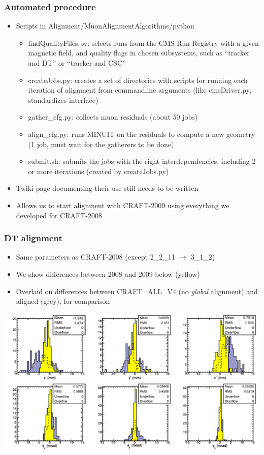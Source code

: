 \documentclass[compress]{beamer}
\begin{document}
\begin{frame}
\frametitle{Automated procedure}
\begin{itemize}
\item Scripts in Alignment/MuonAlignmentAlgorithms/python
\begin{itemize}\setlength{\itemsep}{0.2 cm}
\item findQualityFiles.py: selects runs from the CMS Run Registry with
  a given magnetic field, and quality flags in chosen subsystems, such
  as ``tracker and DT'' or ``tracker and CSC''
\item createJobs.py: creates a set of directories with scripts for
  running each iteration of alignment from commandline arguments (like
  cmsDriver.py, standardizes interface)
\item gather\_cfg.py: collects muon residuals (about 50 jobs)
\item align\_cfg.py: runs MINUIT on the residuals to compute a new
  geometry (1 job, must wait for the gatherers to be done)
\item submit.sh: submits the jobs with the right
  interdependencies, including 2 or more iterations (created by createJobs.py)
\end{itemize}
\item Twiki page documenting their use still needs to be written
\item Allows us to start alignment with CRAFT-2009 using everything we
  developed for CRAFT-2008
\end{itemize}
\end{frame}

\begin{frame}
\frametitle{DT alignment}
\begin{itemize}
\item Same parameters as CRAFT-2008 (except 2\_2\_11 $\to$ 3\_1\_2)
\item We show differences between 2008 and 2009 below (yellow)
\item Overlaid on differences between CRAFT\_ALL\_V4 (no
  {\it global} alignment) and aligned (grey), for comparison
\end{itemize}

\includegraphics[width=\linewidth]{v4_2008_2009.pdf}
\end{frame}
\end{document}
